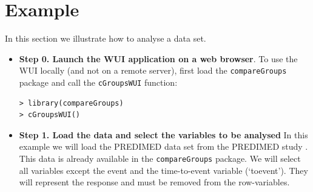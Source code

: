 \documentclass[11pt]{article}
\begin{document}
\newpage
\section{Example}


In this section we illustrate how to analyse a data set.


\begin{itemize}

\item {\bf Step 0. Launch the WUI application on a web browser}. To use the WUI locally (and not on a remote server), first load the {\tt compareGroups} package and call the {\tt cGroupsWUI} function:
\color{blue}
\begin{verbatim}
> library(compareGroups)
> cGroupsWUI()
\end{verbatim}
\color{black}

\item {\bf Step 1. Load the data and select the variables to be analysed}
In this example we will load the PREDIMED data set from the PREDIMED study \citep{PREDIMED}. This data is already available in the {\tt compareGroups} package. 
We will select all variables except the event and the time-to-event variable (`toevent'). They will represent the response and must be removed from the row-variables.
\begin{center}
\end{center}

\vspace{0.5cm}


\end{itemize}
\end{document}

